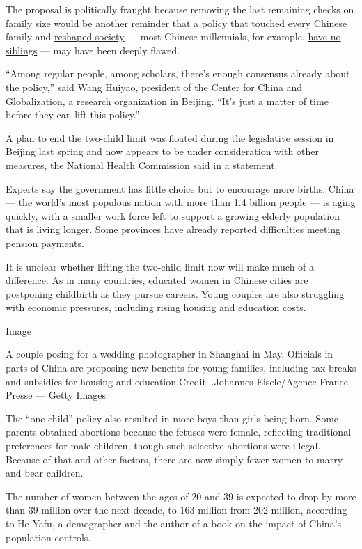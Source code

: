 The proposal is politically fraught because removing the last remaining
checks on family size would be another reminder that a policy that
touched every Chinese family and
\href{https://www.nytimes3xbfgragh.onion/2015/11/06/magazine/the-long-shadow-of-chinas-one-child-policy.html}{reshaped
society} --- most Chinese millennials, for example,
\href{https://www.nytimes3xbfgragh.onion/2015/11/14/world/asia/china-one-child-policy-loneliest-generation.html}{have
no siblings} --- may have been deeply flawed.

``Among regular people, among scholars, there's enough consensus already
about the policy,'' said Wang Huiyao, president of the Center for China
and Globalization, a research organization in Beijing. ``It's just a
matter of time before they can lift this policy.''

A plan to end the two-child limit was floated during the legislative
session in Beijing last spring and now appears to be under consideration
with other measures, the National Health Commission said in a statement.

Experts say the government has little choice but to encourage more
births. China --- the world's most populous nation with more than 1.4
billion people --- is aging quickly, with a smaller work force left to
support a growing elderly population that is living longer. Some
provinces have already reported difficulties meeting pension payments.

It is unclear whether lifting the two-child limit now will make much of
a difference. As in many countries, educated women in Chinese cities are
postponing childbirth as they pursue careers. Young couples are also
struggling with economic pressures, including rising housing and
education costs.

Image

A couple posing for a wedding photographer in Shanghai in May. Officials
in parts of China are proposing new benefits for young families,
including tax breaks and subsidies for housing and
education.Credit...Johannes Eisele/Agence France-Presse --- Getty Images

The ``one child'' policy also resulted in more boys than girls being
born. Some parents obtained abortions because the fetuses were female,
reflecting traditional preferences for male children, though such
selective abortions were illegal. Because of that and other factors,
there are now simply fewer women to marry and bear children.

The number of women between the ages of 20 and 39 is expected to drop by
more than 39 million over the next decade, to 163 million from 202
million, according to He Yafu, a demographer and the author of a book on
the impact of China's population controls.

